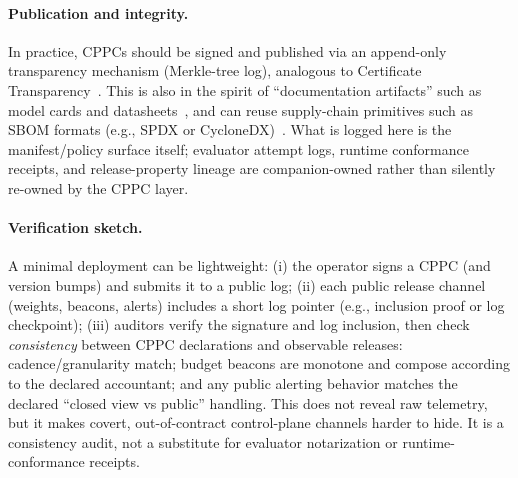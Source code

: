 \documentclass[11pt]{article}
\begin{document}
\paragraph{Publication and integrity.}
In practice, CPPCs should be signed and published via an append-only transparency mechanism (Merkle-tree log),
analogous to Certificate Transparency~\cite{rfc9162_ct}.
This is also in the spirit of ``documentation artifacts'' such as model cards and datasheets~\cite{mitchell2019modelcards,gebru2021datasheets},
and can reuse supply-chain primitives such as SBOM formats (e.g., SPDX or CycloneDX)~\cite{spdx_overview,cyclonedx_overview}.
What is logged here is the manifest/policy surface itself; evaluator attempt logs, runtime conformance receipts, and release-property lineage are companion-owned rather than silently re-owned by the CPPC layer.\cite{series:evalnotary,series:opB,series:release}

\paragraph{Verification sketch.}
A minimal deployment can be lightweight:
(i) the operator signs a CPPC (and version bumps) and submits it to a public log;
(ii) each public release channel (weights, beacons, alerts) includes a short log pointer (e.g., inclusion proof or log checkpoint);
(iii) auditors verify the signature and log inclusion, then check \emph{consistency} between CPPC declarations and observable releases:
cadence/granularity match; budget beacons are monotone and compose according to the declared accountant; and any public alerting behavior
matches the declared ``closed view vs public'' handling.
This does not reveal raw telemetry, but it makes covert, out-of-contract control-plane channels harder to hide. It is a consistency audit, not a substitute for evaluator notarization or runtime-conformance receipts.\cite{series:evalnotary,series:opB}
\end{document}
